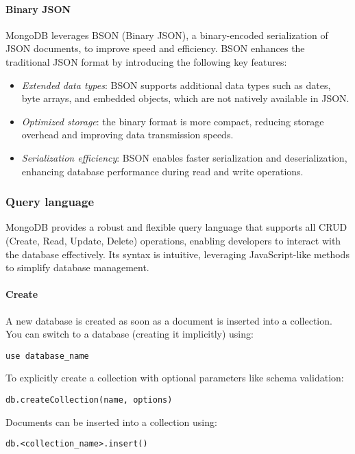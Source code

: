 \paragraph*{Binary JSON} 
MongoDB leverages BSON (Binary JSON), a binary-encoded serialization of JSON documents, to improve speed and efficiency. 
BSON enhances the traditional JSON format by introducing the following key features:
\begin{itemize} 
    \item \textit{Extended data types}: BSON supports additional data types such as dates, byte arrays, and embedded objects, which are not natively available in JSON. 
    \item \textit{Optimized storage}: the binary format is more compact, reducing storage overhead and improving data transmission speeds. 
    \item \textit{Serialization efficiency}: BSON enables faster serialization and deserialization, enhancing database performance during read and write operations. 
\end{itemize}

























\subsubsection{Query language}
MongoDB provides a robust and flexible query language that supports all CRUD (Create, Read, Update, Delete) operations, enabling developers to interact with the database effectively. 
Its syntax is intuitive, leveraging JavaScript-like methods to simplify database management.

\paragraph*{Create}
A new database is created as soon as a document is inserted into a collection. 
You can switch to a database (creating it implicitly) using:
\begin{lstlisting}[style=MongoDB]
use database_name
\end{lstlisting}
To explicitly create a collection with optional parameters like schema validation:
\begin{lstlisting}[style=MongoDB]
db.createCollection(name, options)
\end{lstlisting}
Documents can be inserted into a collection using:
\begin{lstlisting}[style=MongoDB]
db.<collection_name>.insert()
\end{lstlisting}

